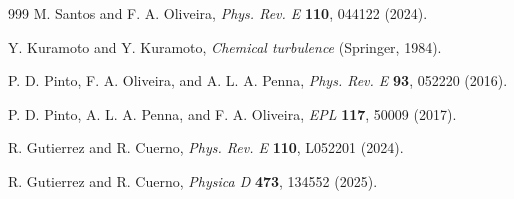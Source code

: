 \documentclass[pre,aps,twocolumn,showpacs,floatfix,nofootinbib,superscriptaddress,linenumbers]{revtex4-1}
\begin{document}
\begin{thebibliography}{999}
 M. Santos and F. A. Oliveira, \textit{Phys. Rev. E} \textbf{110}, 044122 (2024).

 Y. Kuramoto and Y. Kuramoto, \textit{Chemical turbulence} (Springer, 1984).

 P. D. Pinto, F. A. Oliveira, and A. L. A. Penna, \textit{Phys. Rev. E} \textbf{93}, 052220 (2016).

 P. D. Pinto, A. L. A. Penna, and F. A. Oliveira, \textit{EPL} \textbf{117}, 50009 (2017).

 R. Gutierrez and R. Cuerno, \textit{Phys. Rev. E} \textbf{110}, L052201 (2024).

 R. Gutierrez and R. Cuerno, \textit{Physica D} \textbf{473}, 134552 (2025).

\end{thebibliography}
\end{document}

